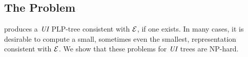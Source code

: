 %
%


\vspace{-0.1cm}
\subsection{The  Problem}

\vspace{-0.1cm}
 produces a $\textit{UI}$ PLP-tree consistent with $\mathcal{E}$, if one exists.
In many cases, it is desirable to compute a small, sometimes even the smallest, 
representation consistent with $\mathcal{E}$.
We show that these problems for $\textit{UI}$ trees are NP-hard.

